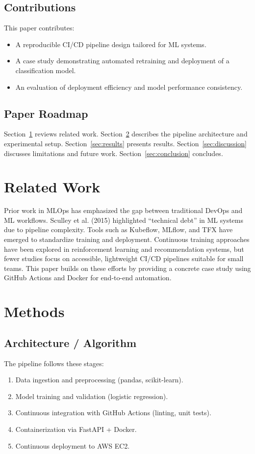 \documentclass[11pt]{article}
\begin{document}
\subsection{Contributions}
This paper contributes:
\begin{itemize}
    \item A reproducible CI/CD pipeline design tailored for ML systems.
    \item A case study demonstrating automated retraining and deployment of a classification model.
    \item An evaluation of deployment efficiency and model performance consistency.
\end{itemize}

\subsection{Paper Roadmap}
Section~\ref{sec:related} reviews related work. Section~\ref{sec:methods} describes the pipeline architecture and experimental setup. Section~\ref{sec:results} presents results. Section~\ref{sec:discussion} discusses limitations and future work. Section~\ref{sec:conclusion} concludes.

\section{Related Work} \label{sec:related}
Prior work in MLOps has emphasized the gap between traditional DevOps and ML workflows. \cite{sculley2015}Sculley et al. (2015) highlighted ``technical debt'' in ML systems due to pipeline complexity. Tools such as Kubeflow, MLflow, and TFX have emerged to standardize training and deployment. Continuous training approaches have been explored in reinforcement learning and recommendation systems, but fewer studies focus on accessible, lightweight CI/CD pipelines suitable for small teams. This paper builds on these efforts by providing a concrete case study using GitHub Actions and Docker for end-to-end automation.

\section{Methods} \label{sec:methods}
\subsection{Architecture / Algorithm}
The pipeline follows these stages:
\begin{enumerate}
    \item Data ingestion and preprocessing (pandas, scikit-learn).
    \item Model training and validation (logistic regression).
    \item Continuous integration with GitHub Actions (linting, unit tests).
    \item Containerization via FastAPI + Docker.
    \item Continuous deployment to AWS EC2.
\end{enumerate}
\end{document}
